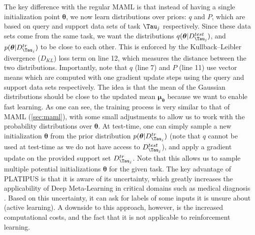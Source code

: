 The key difference with the regular MAML is that instead of having a single initialization point $\boldsymbol{\theta}$, we now learn distributions over priors: $q$ and $P$, which are based on query and support data sets of task $\Tau_{j}$ respectively. Since these data sets come from the same task, we want the distributions $q(\boldsymbol{\theta} | D^{test}_{\Tau_{j}})$, and $p(\boldsymbol{\theta} | D^{tr}_{\Tau_{j}})$ to be close to each other. This is enforced by the Kullback–Leibler divergence ($D_{\mathit{KL}}$) loss term on line 12, which measures the distance between the two distributions. Importantly, note that $q$ (line 7) and $P$ (line 11) use vector means which are computed with one gradient update steps using the query and support data sets respectively. The idea is that the mean of the Gaussian distributions should be close to the updated mean $\boldsymbol{\mu}_{\boldsymbol{\theta}}$ because we want to enable fast learning.  As one can see, the training process is very similar to that of MAML  (\autoref{sec:maml}), with some small adjustments to allow us to work with the probability distributions over $\boldsymbol{\theta}$.
At test-time, one can simply sample a new initialization $\boldsymbol{\theta}$ from the prior distribution $p(\boldsymbol{\theta} | D^{tr}_{\Tau_{j}})$ (note that $q$ cannot be used at test-time as we do not have access to $D^{test}_{\Tau_{j}}$), and apply a gradient update on the provided support set $D^{tr}_{\Tau_{j}}$. Note that this allows us to sample multiple potential initializations $\boldsymbol{\theta}$ for the given task. 
The key advantage of PLATIPUS is that it is aware of its uncertainty, which greatly increases the applicability of Deep Meta-Learning in critical domains such as medical diagnosis . Based on this uncertainty, it can ask for labels of some inputs it is unsure about (active learning). A downside to this approach, however, is the increased computational costs, and the fact that it is not applicable to reinforcement learning.

